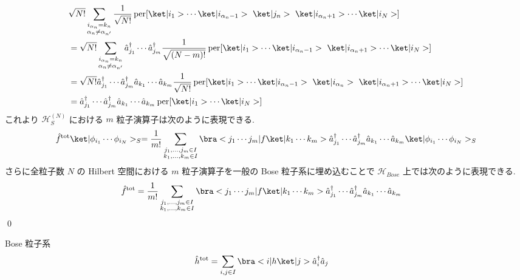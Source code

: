 \documentclass[uplatex,dvipdfmx,a4paper,11pt]{jlreq}
\makeatletter
\DeclareMathOperator{\per}{per}
\newcommand{\HH}{\mathcal{H}}
\numberwithin{equation}{section}
\theoremstyle{definition}
\renewenvironment{proof}[1][\proofname]{\par
  \normalfont
  \topsep6\p@\@plus6\p@ \trivlist
  \item[\hskip\labelsep{\bfseries #1}\@addpunct{\bfseries}]\ignorespaces\quad\par
}{%
  \qed\endtrivlist\@endpefalse
}
\renewcommand\proofname{証明}
\makeatother
\begin{document}
\begin{proof}
\begin{align}
     & \sqrt{N!}\sum_{\substack{i_{\alpha_n} = k_n                                                                                                                                                                        \\ \alpha_n\neq\alpha_{n'}}}\frac{1}{\sqrt{N!}}\per[\ket|i_1>\cdots\ket|i_{\alpha_n-1}> \ \ket|j_n> \ \ket|i_{\alpha_n+1}>\cdots\ket|i_N>] \\
     & = \sqrt{N!}\sum_{\substack{i_{\alpha_n} = k_n                                                                                                                                                                      \\ \alpha_n\neq\alpha_{n'}}}\hat{a}_{j_1}^\dagger\cdots\hat{a}_{j_m}^\dagger\frac{1}{\sqrt{(N - m)!}}\per[\ket|i_1>\cdots\ket|i_{\alpha_n-1}> \ \ket|i_{\alpha_n+1}>\cdots\ket|i_N>] \\
     & = \sqrt{N!}\hat{a}_{j_1}^\dagger\cdots\hat{a}_{j_m}^\dagger\hat{a}_{k_1}\cdots\hat{a}_{k_m}\frac{1}{\sqrt{N!}}\per[\ket|i_1>\cdots\ket|i_{\alpha_n-1}> \ \ket|i_{\alpha_n}> \ \ket|i_{\alpha_n+1}>\cdots\ket|i_N>] \\
     & = \hat{a}_{j_1}^\dagger\cdots\hat{a}_{j_m}^\dagger\hat{a}_{k_1}\cdots\hat{a}_{k_m}\per[\ket|i_1>\cdots\ket|i_N>]
  \end{align}
  これより $\HH_S^{(N)}$ における $m$ 粒子演算子は次のように表現できる.
  \begin{align}
    \hat{f}^{\mathrm{tot}}\ket|\phi_{i_1}\cdots\phi_{i_N}>_S = \frac{1}{m!}\sum_{\substack{j_1,\ldots,j_m\in I \\ k_1,\ldots,k_m\in I}}\bra<j_1\cdots j_m|f\ket|k_1\cdots k_m>\hat{a}_{j_1}^\dagger\cdots\hat{a}_{j_m}^\dagger\hat{a}_{k_1}\cdots\hat{a}_{k_m}\ket|\phi_{i_1}\cdots\phi_{i_N}>_S
  \end{align}
  さらに全粒子数 $N$ の Hilbert 空間における $m$ 粒子演算子を一般の Bose 粒子系に埋め込むことで $\HH_{Bose}$ 上では次のように表現できる.
  \begin{align}
    \hat{f}^{\mathrm{tot}} & = \frac{1}{m!}\sum_{\substack{j_1,\ldots,j_m\in I \\ k_1,\ldots,k_m\in I}}\bra<j_1\cdots j_m|f\ket|k_1\cdots k_m>\hat{a}_{j_1}^\dagger\cdots\hat{a}_{j_m}^\dagger\hat{a}_{k_1}\cdots\hat{a}_{k_m}
  \end{align}
\end{proof}
\begin{example}
  Bose 粒子系
  \begin{align}
    \hat{h}^{\mathrm{tot}} & = \sum_{i,j\in I}\bra<i|h\ket|j>\hat{a}_i^\dagger\hat{a}_j
  \end{align}

\end{example}
\end{document}
